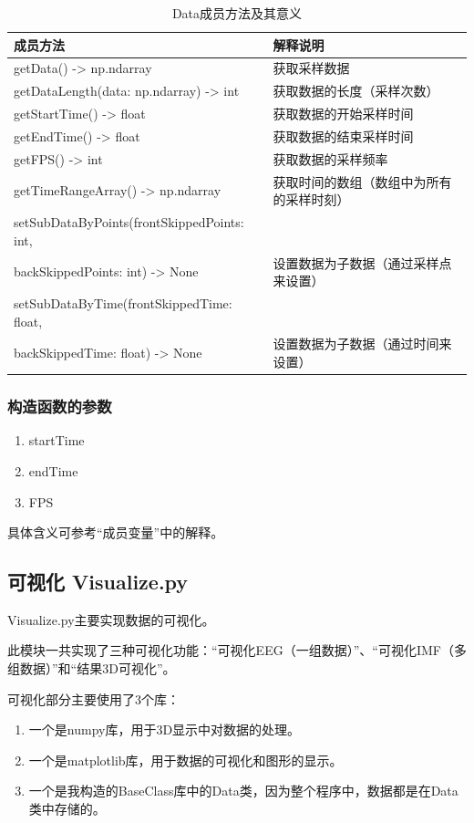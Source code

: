 \documentclass[cs4size,a4paper]{ctexart}
\numberwithin{equation}{section}
\numberwithin{table}{section}
\numberwithin{figure}{section}
\begin{document}
\begin{table}[H]
\caption{Data成员方法及其意义}
\centering
\begin{tabular}{l|l}
\toprule
成员方法 & 解释说明\\
\midrule[2pt]
getData() -> np.ndarray &  获取采样数据\\
getDataLength(data: np.ndarray) -> int &  获取数据的长度（采样次数）\\
getStartTime() -> float & 获取数据的开始采样时间\\
getEndTime() -> float & 获取数据的结束采样时间\\
getFPS() -> int & 获取数据的采样频率\\
getTimeRangeArray() -> np.ndarray &  获取时间的数组（数组中为所有的采样时刻）\\
setSubDataByPoints(frontSkippedPoints: int,\\ backSkippedPoints: int) -> None &  设置数据为子数据（通过采样点来设置）\\
setSubDataByTime(frontSkippedTime: float,\\ backSkippedTime: float) -> None &  设置数据为子数据（通过时间来设置）\\
\bottomrule
\end{tabular}
\end{table}

\subsubsection{构造函数的参数}

\begin{enumerate}
\item startTime
\item endTime
\item FPS
\end{enumerate}

具体含义可参考“成员变量”中的解释。

\subsection{可视化 Visualize.py}

\colorbox{LetMeFlyGray}{Visualize.py}主要实现数据的可视化。

此模块一共实现了三种可视化功能：“可视化EEG（一组数据）”、“可视化IMF（多组数据）”和“结果3D可视化”。

可视化部分主要使用了3个库：

\begin{enumerate}
\item 一个是\colorbox{LetMeFlyGray}{numpy}库，用于3D显示中对数据的处理。
\item 一个是\colorbox{LetMeFlyGray}{matplotlib}库，用于数据的可视化和图形的显示。
\item 一个是我构造的\colorbox{LetMeFlyGray}{BaseClass}库中的\colorbox{LetMeFlyGray}{Data}类，因为整个程序中，数据都是在\colorbox{LetMeFlyGray}{Data}类中存储的。
\end{enumerate}
\end{document}
